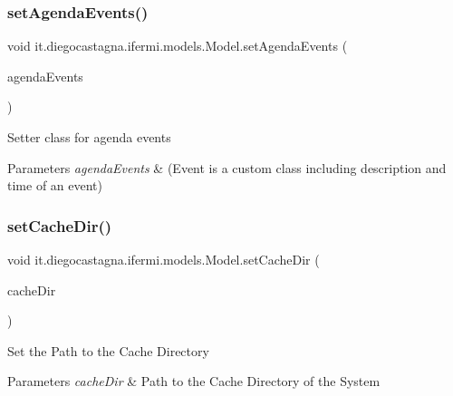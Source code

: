 \subsubsection{\texorpdfstring{setAgendaEvents()}{setAgendaEvents()}}
{\footnotesize\ttfamily void it.\+diegocastagna.\+ifermi.\+models.\+Model.\+set\+Agenda\+Events (\begin{DoxyParamCaption}\item[{Map$<$ Calendar\+Day, Array\+List$<$ \mbox{\hyperlink{classit_1_1diegocastagna_1_1ifermi_1_1utils_1_1_event}{Event}} $>$$>$}]{agenda\+Events }\end{DoxyParamCaption})\hspace{0.3cm}{\ttfamily [inline]}}

Setter class for agenda events 
\begin{DoxyParams}{Parameters}
{\em agenda\+Events} & (Event is a custom class including description and time of an event) \\
\hline
\end{DoxyParams}
\mbox{\label{classit_1_1diegocastagna_1_1ifermi_1_1models_1_1_model_a90da1fb737e4d0a692a13c4ed3e8cb47}} 
\subsubsection{\texorpdfstring{setCacheDir()}{setCacheDir()}}
{\footnotesize\ttfamily void it.\+diegocastagna.\+ifermi.\+models.\+Model.\+set\+Cache\+Dir (\begin{DoxyParamCaption}\item[{File}]{cache\+Dir }\end{DoxyParamCaption})\hspace{0.3cm}{\ttfamily [inline]}}

Set the Path to the Cache Directory 
\begin{DoxyParams}{Parameters}
{\em cache\+Dir} & Path to the Cache Directory of the System \\
\hline
\end{DoxyParams}
\mbox{\label{classit_1_1diegocastagna_1_1ifermi_1_1models_1_1_model_a30cac7871b09f12804d672e4a003c05c}} 
